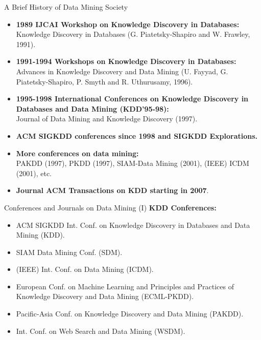 \begin{frame}{A Brief History of Data Mining Society}
	\begin{itemize}
		\item \textbf{1989 IJCAI Workshop on Knowledge Discovery in
			      Databases:}\\
		      Knowledge Discovery in Databases (G. Piatetsky-Shapiro and W. Frawley,
		      1991).
		\item \textbf{1991-1994 Workshops on Knowledge Discovery in
			      Databases:}\\
		      Advances in Knowledge Discovery and Data Mining (U. Fayyad, G.
		      Piatetsky-Shapiro, P. Smyth and R. Uthurusamy, 1996).
		\item \textbf{1995-1998 International Conferences on Knowledge
			      Discovery in Databases and Data Mining (KDD’95-98):}\\
		      Journal of Data Mining and Knowledge Discovery (1997).
		\item \textbf{ACM SIGKDD conferences since 1998 and SIGKDD
			      Explorations.}\\
		\item \textbf{More conferences on data mining:}\\
		      PAKDD (1997), PKDD (1997), SIAM-Data Mining (2001), (IEEE) ICDM (2001),
		      etc.
		\item \textbf{Journal ACM Transactions on KDD starting in 2007}.
	\end{itemize}
\end{frame}

\begin{frame}{Conferences and Journals on Data Mining (I)}
	\textbf{KDD Conferences:}
	\begin{itemize}
		\item ACM SIGKDD Int. Conf. on Knowledge Discovery in Databases and
		      Data Mining (KDD).
		\item SIAM Data Mining Conf. (SDM).
		\item (IEEE) Int. Conf. on Data Mining (ICDM).
		\item European Conf. on Machine Learning and Principles and Practices
		      of Knowledge Discovery and Data Mining (ECML-PKDD).
		\item Pacific-Asia Conf. on Knowledge Discovery and Data Mining (PAKDD).
		\item Int. Conf. on Web Search and Data Mining (WSDM).
	\end{itemize}
\end{frame}

